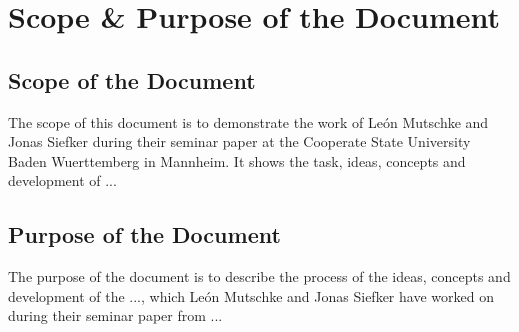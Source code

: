

\chapter*{Scope \& Purpose of the Document}

\section*{Scope of the Document}
  The scope of this document is to demonstrate the work of Le\'{o}n Mutschke and Jonas Siefker during their seminar paper at the Cooperate State University Baden Wuerttemberg in Mannheim. It shows the task, ideas, concepts and development of ... %

\section*{Purpose of the Document}
  The purpose of the document is to describe the process of the ideas, concepts and development of the ..., which Le\'{o}n Mutschke and Jonas Siefker have worked on during their seminar paper from ... %

